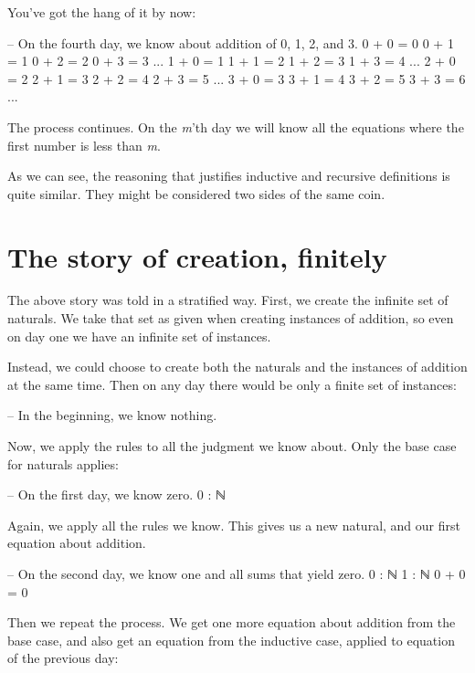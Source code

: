You've got the hang of it by now:

\begin{myDisplay}
-- On the fourth day, we know about addition of 0, 1, 2, and 3.
0 + 0 = 0     0 + 1 = 1     0 + 2 = 2     0 + 3 = 3     ...
1 + 0 = 1     1 + 1 = 2     1 + 2 = 3     1 + 3 = 4     ...
2 + 0 = 2     2 + 1 = 3     2 + 2 = 4     2 + 3 = 5     ...
3 + 0 = 3     3 + 1 = 4     3 + 2 = 5     3 + 3 = 6     ...
\end{myDisplay}

The process continues. On the \emph{m}'th day we will know all the
equations where the first number is less than \emph{m}.

As we can see, the reasoning that justifies inductive and recursive
definitions is quite similar. They might be considered two sides of the
same coin.

\hypertarget{Naturals-finite-creation}{%
\section{The story of creation,
finitely}\label{Naturals-finite-creation}}

The above story was told in a stratified way. First, we create the
infinite set of naturals. We take that set as given when creating
instances of addition, so even on day one we have an infinite set of
instances.

Instead, we could choose to create both the naturals and the instances
of addition at the same time. Then on any day there would be only a
finite set of instances:

\begin{myDisplay}
-- In the beginning, we know nothing.
\end{myDisplay}

Now, we apply the rules to all the judgment we know about. Only the base
case for naturals applies:

\begin{myDisplay}
-- On the first day, we know zero.
0 : ℕ
\end{myDisplay}

Again, we apply all the rules we know. This gives us a new natural, and
our first equation about addition.

\begin{myDisplay}
-- On the second day, we know one and all sums that yield zero.
0 : ℕ
1 : ℕ    0 + 0 = 0
\end{myDisplay}

Then we repeat the process. We get one more equation about addition from
the base case, and also get an equation from the inductive case, applied
to equation of the previous day:

